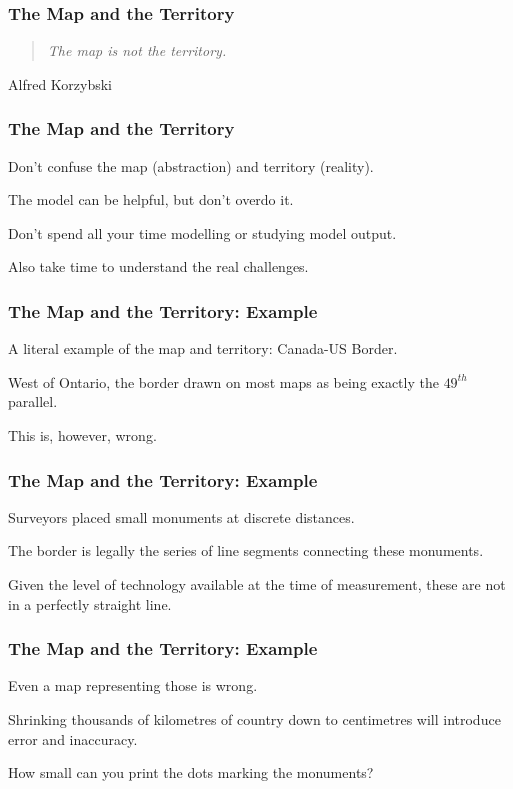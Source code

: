 \begin{frame}
\frametitle{The Map and the Territory}
\begin{changemargin}{1cm}

\begin{quote}
\textit{The map is not the territory.}
\end{quote}
\hfill Alfred Korzybski

\end{changemargin}
\end{frame}

\begin{frame}
\frametitle{The Map and the Territory}
\begin{changemargin}{1cm}
Don't confuse the map (abstraction) and territory (reality).

The model can be helpful, but don't overdo it.

Don't spend all your time modelling or studying model output.

Also take time to understand the real challenges.

\end{changemargin}
\end{frame}

\begin{frame}
\frametitle{The Map and the Territory: Example}
\begin{changemargin}{1cm}
A literal example of the map and territory: Canada-US Border.

West of Ontario, the border drawn on most maps as being exactly the $49^{th}$ parallel.

This is, however, wrong.

\end{changemargin}
\end{frame}

\begin{frame}
\frametitle{The Map and the Territory: Example}
\begin{changemargin}{1cm}
Surveyors placed small monuments at discrete distances.

The border is legally the series of line segments connecting these monuments.

Given the level of technology available at the time of measurement, these are not in a perfectly straight line.

\end{changemargin}
\end{frame}

\begin{frame}
\frametitle{The Map and the Territory: Example}
\begin{changemargin}{1cm}
Even a map representing those is wrong.

Shrinking thousands of kilometres of country down to centimetres will introduce error and inaccuracy.

How small can you print the dots marking the monuments?

\end{changemargin}
\end{frame}


